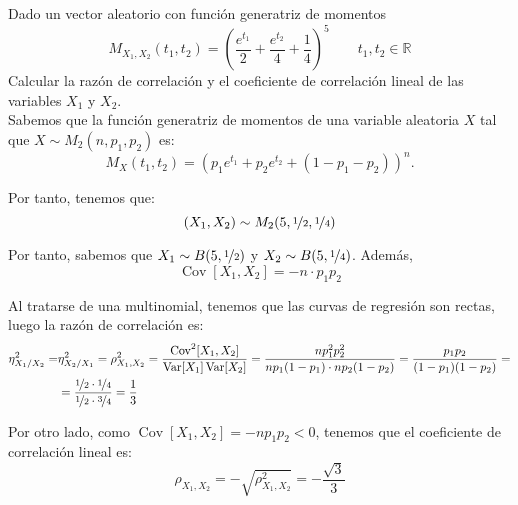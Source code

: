 \documentclass[12pt]{article}
\DeclareMathOperator{\Var}{Var}
\DeclareMathOperator{\Cov}{Cov}
\begin{document}
    \begin{ejercicio}
        Dado un vector aleatorio con función generatriz de momentos
        \begin{equation*}
            M_{X_1,X_2}(t_1,t_2) = {\left(\dfrac{e^{t_1}}{2}+\dfrac{e^{t_2}}{4}+\dfrac{1}{4}\right)}^{5} \qquad t_1,t_2 \in \mathbb{R}
        \end{equation*}
        Calcular la razón de correlación y el coeficiente de correlación lineal de las variables $X_1$ y $X_2$.\\

        Sabemos que la función generatriz de momentos de una variable aleatoria $X$ tal que $X\sim M_2(n,p_1,p_2)$ es:
        \begin{equation*}
            M_X(t_1,t_2) = {\left(p_1e^{t_1}+p_2e^{t_2}+(1-p_1-p_2)\right)}^n.
        \end{equation*}

        Por tanto, tenemos que:
        \begin{equation*}
            (X_1,X_2)\sim M_2(5,\nicefrac{1}{2},\nicefrac{1}{4})
        \end{equation*}

        Por tanto, sabemos que $X_1\sim B(5,\nicefrac{1}{2})$ y $X_2\sim B(5,\nicefrac{1}{4})$. Además,
        $$\Cov[X_1,X_2]=-n\cdot p_1p_2$$

        Al tratarse de una multinomial, tenemos que las curvas de regresión son rectas, luego la razón de correlación es:
        \begin{align*}
            \eta^2_{X_1/X_2}
            =& \eta^2_{X_2/X_1}
            = \rho_{X_1,X_2}^2
            = \dfrac{\Cov^2[X_1,X_2]}{\Var[X_1]\Var[X_2]}
            = \dfrac{np_1^2p_2^2}{np_1(1-p_1)\cdot np_2(1-p_2)}
            = \dfrac{p_1p_2}{(1-p_1)(1-p_2)}
            =\\&= \dfrac{\nicefrac{1}{2}\cdot \nicefrac{1}{4}}{\nicefrac{1}{2}\cdot \nicefrac{3}{4}}
            = \dfrac{1}{3}
        \end{align*}

        Por otro lado, como $\Cov[X_1,X_2]=-np_1p_2<0$, tenemos que el coeficiente de correlación lineal es:
        \begin{equation*}
            \rho_{X_1,X_2} = -\sqrt{\rho_{X_1,X_2}^2}
            = -\dfrac{\sqrt{3}}{3}
        \end{equation*}
    \end{ejercicio}
\end{document}
